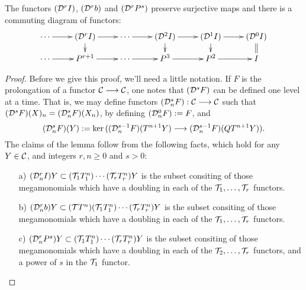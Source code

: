 \documentclass[10pt]{article}
\newcommand{\Comm}{\calC}
\begin{document}
\begin{convergence}
%
\begin{lem}\label{towerWithPowers}
The functors $(\mathcal{D}^{\smash{r}}I)$, $(\mathcal{D}^{\smash{r}}b)$ and $(\mathcal{D}^{\smash{r}}P^{s})$ preserve surjective maps and there is a commuting diagram of functors:
\[\xymatrix@R=4mm{
\cdots 
\ar[r]
&%
(\caldup{r}I)
\ar[r]
\ar[d]
&%
\cdots \ar[r]
&%
(\caldup{2}I)
\ar[r]
\ar[d]
&%
(\caldup{1}I)
\ar[r]
\ar[d]&%
(\caldup{0}I)
\ar@{=}[d]
\\%
\cdots
\ar[r]
&%
P^{r+1}
\ar[r]
&%
\cdots 
\ar[r]&%
P^3
\ar[r]
&P^2
\ar[r]
&%
I%
}\]
\end{lem}
\begin{proof}
Before we give this proof, we'll need a little notation.
If $F$ is the prolongation of a functor $\Comm\to\Comm$, one notes that $(\mathcal{D}^{\smash{s}}F)$ can be defined one level at a time. That is,  we may define functors $(\caldupdown{s}{n}F):\Comm\to\Comm$ such that $(\mathcal{D}^{\smash{s}}F)(X)_n=(\mathcal{D}^{\smash{s}}_{\smash{n}}F)(X_n)$, by defining $(\mathcal{D}^{\smash{0}}_{\smash{n}}F):=F$, and
\[(\mathcal{D}^{\smash{s}}_{\smash{n}}F)(Y):=\textup{ker}\,((\mathcal{D}^{\smash{s-1}}_{\smash{n}}F)(T^{n+1}Y)\longrightarrow (\mathcal{D}^{\smash{s-1}}_{\smash{n}}F)(QT^{n+1}Y)).\]
The claims of the lemma follow from the following facts, which hold for any $Y\in\Comm$, and integers $r,n\geq0$ and $s>0$:
\begin{enumerate}
\squishlist
\setlength{\parindent}{.25in}
\item[a)] $(\mathcal{D}^{\smash{r}}_{\smash{n}}I)Y\subset (\mathcal{T}_1T^n_1)\cdots (\mathcal{T}_rT^n_r)Y$ is the subset consiting of those mega\-monomials which have a doubling in each of the $\mathcal{T}_1,\ldots,\mathcal{T}_r$ functors.
\item[b)] $(\mathcal{D}^{\smash{r}}_{\smash{n}}b)Y\subset (\mathcal{T} T^n)(\mathcal{T}_1T^n_1)\cdots (\mathcal{T}_rT^n_r)Y$ is the subset consiting of those mega\-monomials which have a doubling in each of the $\mathcal{T}_1,\ldots,\mathcal{T}_r$ functors.
\item[c)] $(\mathcal{D}^{\smash{r}}_{\smash{n}}P^{s})Y\subset (\mathcal{T}_1T^n_1)\cdots (\mathcal{T}_rT^n_r)Y$ is the subset consiting of those mega\-monomials which have a doubling in each of the $\mathcal{T}_2,\ldots,\mathcal{T}_r$ functors, and a power of $s$ in the $\mathcal{T}_1$ functor.

\end{enumerate}
\end{proof}
\end{convergence}
\end{document}
